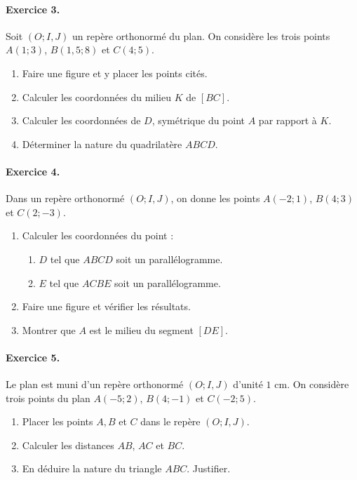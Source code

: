 \documentclass[11pt]{article}
\begin{document}
\paragraph{Exercice 3.} Soit $(O; I, J)$ un repère orthonormé du plan. On
considère les trois points $A(1; 3)$, $B(1,5 ; 8)$ et $C(4; 5)$.
\begin{enumerate}
  \item Faire une figure et y placer les points cités.
  \item Calculer les coordonnées du milieu $K$ de $\left[ BC \right]$.
  \item Calculer les coordonnées de $D$, symétrique du point $A$ par rapport à
    $K$.
  \item Déterminer la nature du quadrilatère $ABCD$.
\end{enumerate}

\paragraph{Exercice 4.} Dans un repère orthonormé $(O; I, J)$, on donne les
points $A(-2; 1)$, $B(4; 3)$ et $C(2; -3)$.
\begin{enumerate}
  \item Calculer les coordonnées du point :\begin{enumerate}
      \item $D$ tel que $ABCD$ soit un parallélogramme.
      \item $E$ tel que $ACBE$ soit un parallélogramme.
    \end{enumerate}
  \item Faire une figure et vérifier les résultats.
  \item Montrer que $A$ est le milieu du segment $\left[ DE \right]$.
\end{enumerate}

\paragraph{Exercice 5.} Le plan est muni d'un repère orthonormé $(O; I, J)$
d'unité $1$ cm. On considère trois points du plan $A(-5; 2)$, $B(4; -1)$ et
$C(-2; 5)$.
\begin{enumerate}
  \item Placer les points $A, B$ et $C$ dans le repère $(O; I, J)$.
  \item Calculer les distances $AB$, $AC$ et $BC$.
  \item En déduire la nature du triangle $ABC$. Justifier.
\end{enumerate}
\end{document}
